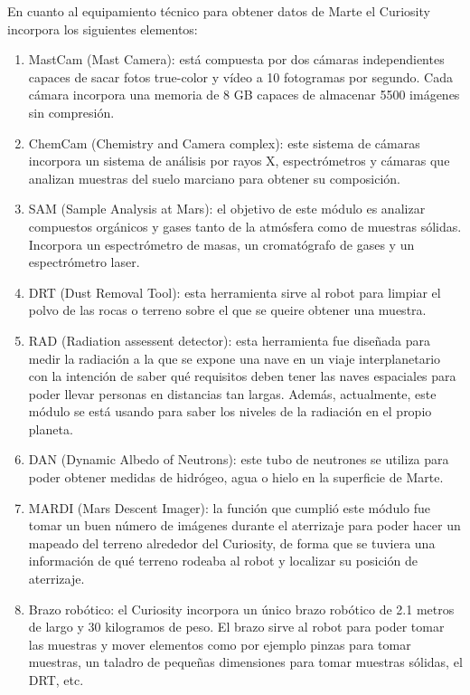 En cuanto al equipamiento técnico para obtener datos de Marte el Curiosity incorpora los siguientes elementos:

\begin{enumerate}
  \item MastCam (Mast Camera): está compuesta por dos cámaras independientes capaces de sacar fotos true-color y vídeo a 10 fotogramas por segundo. Cada cámara incorpora una memoria de 8 GB capaces de almacenar 5500 imágenes sin compresión.
  \item ChemCam (Chemistry and Camera complex): este sistema de cámaras incorpora un sistema de análisis por rayos X, espectrómetros y cámaras que analizan muestras del suelo marciano para obtener su composición.
  \item SAM (Sample Analysis at Mars): el objetivo de este módulo es analizar compuestos orgánicos y gases tanto de la atmósfera como de muestras sólidas. Incorpora un espectrómetro de masas, un cromatógrafo de gases y un espectrómetro laser.
  \item DRT (Dust Removal Tool): esta herramienta sirve al robot para limpiar el polvo de las rocas o terreno sobre el que se queire obtener una muestra.
  \item RAD (Radiation assessent detector): esta herramienta fue diseñada para medir la radiación a la que se expone una nave en un viaje interplanetario con la intención de saber qué requisitos deben tener las naves espaciales para poder llevar personas en distancias tan largas. Además, actualmente, este módulo se está usando para saber los niveles de la radiación en el propio planeta.
  \item DAN (Dynamic Albedo of Neutrons): este tubo de neutrones se utiliza para poder obtener medidas de hidrógeo, agua o hielo en la superficie de Marte.
  \item MARDI (Mars Descent Imager): la función que cumplió este módulo fue tomar un buen número de imágenes durante el aterrizaje para poder hacer un mapeado del terreno alrededor del Curiosity, de forma que se tuviera una información de qué terreno rodeaba al robot y localizar su posición de aterrizaje.
  \item Brazo robótico: el Curiosity incorpora un único brazo robótico de 2.1 metros de largo y 30 kilogramos de peso. El brazo sirve al robot para poder tomar las muestras y mover elementos como por ejemplo pinzas para tomar muestras, un taladro de pequeñas dimensiones para tomar muestras sólidas, el DRT, etc.
\end{enumerate}

